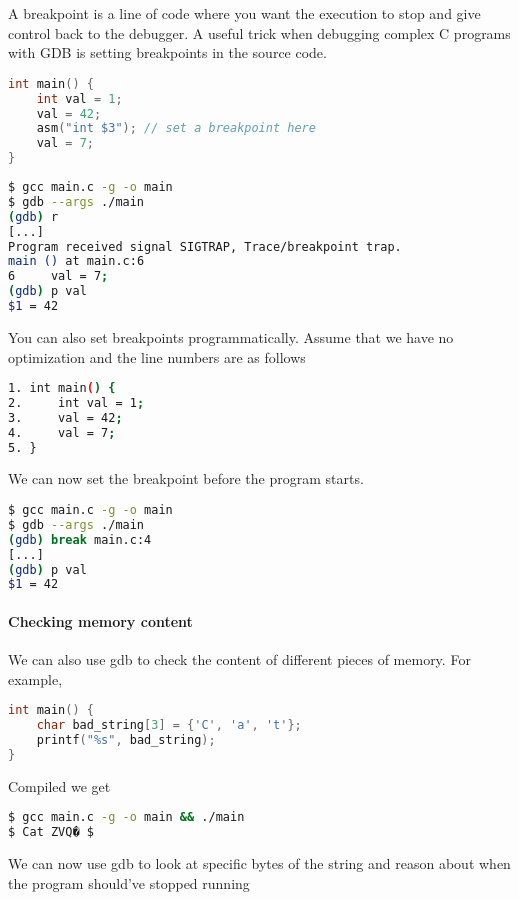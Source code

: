 A breakpoint is a line of code where you want the execution to stop and give control back to the debugger.
A useful trick when debugging complex C programs with GDB is setting breakpoints in the source code.

\begin{lstlisting}[language=C]
int main() {
    int val = 1;
    val = 42;
    asm("int $3"); // set a breakpoint here
    val = 7;
}
\end{lstlisting}

\begin{lstlisting}[language=bash]
$ gcc main.c -g -o main
$ gdb --args ./main
(gdb) r
[...]
Program received signal SIGTRAP, Trace/breakpoint trap.
main () at main.c:6
6     val = 7;
(gdb) p val
$1 = 42
\end{lstlisting}

You can also set breakpoints programmatically.
Assume that we have no optimization and the line numbers are as follows

\begin{lstlisting}[language=bash]
1. int main() {
2.     int val = 1;
3.     val = 42;
4.     val = 7;
5. }
\end{lstlisting}

We can now set the breakpoint before the program starts.

\begin{lstlisting}[language=bash]
$ gcc main.c -g -o main
$ gdb --args ./main
(gdb) break main.c:4
[...]
(gdb) p val
$1 = 42
\end{lstlisting}

\paragraph{Checking memory content}


We can also use gdb to check the content of different pieces of memory.
For example,

\begin{lstlisting}[language=C]
int main() {
    char bad_string[3] = {'C', 'a', 't'};
    printf("%s", bad_string);
}
\end{lstlisting}

Compiled we get

\begin{lstlisting}[language=bash]
$ gcc main.c -g -o main && ./main
$ Cat ZVQ� $
\end{lstlisting}


We can now use gdb to look at specific bytes of the string and reason about when the program should've stopped running

